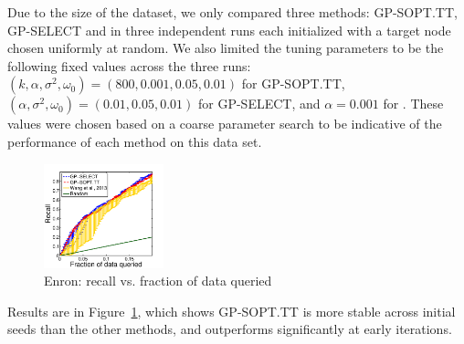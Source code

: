 Due to the size of the dataset, we only compared three methods: GP-SOPT.TT, GP-SELECT and \cite{wang2013active}
in three independent runs each initialized with a target node chosen uniformly at random.
We also limited the tuning parameters to be the following fixed values across the three runs:
$(k,\alpha,\sigma^2,\omega_0) = (800, 0.001, 0.05, 0.01)$ for GP-SOPT.TT, $(\alpha, \sigma^2, \omega_0) = (0.01, 0.05, 0.01)$ for GP-SELECT, 
and $\alpha = 0.001$ for \cite{wang2013active}. These values were chosen based on a coarse parameter search to be indicative of the performance of each method on this data set.
\begin{figure}[t]
\centering
\includegraphics[width=0.31\textwidth,height=0.25\textwidth]{../exp/final_results/enron.pdf}
\caption{Enron: recall vs. fraction of data queried}
\label{fig:enron}
\end{figure}
Results are in Figure~\ref{fig:enron}, which shows GP-SOPT.TT is more stable across initial seeds than the other methods, and outperforms \cite{wang2013active} significantly at early iterations. 

